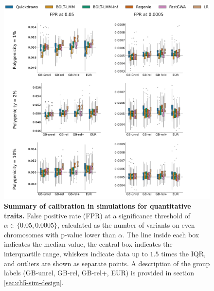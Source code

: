\begin{figure}[h!]
    \centering
    \includegraphics[width=\textwidth]{figures/sim_calibration/qt_fpr.pdf}
    
    \caption{\textbf{Summary of calibration in simulations for quantitative traits.}
    False positive rate (FPR) at a significance threshold of $\alpha \in \{0.05, 0.0005\}$, calculated as the number of variants on even chromosomes with p-value lower than $\alpha$.
    The line inside each box indicates the median value, the central box indicates the interquartile range, whiskers indicate data up to $1.5$ times the IQR, and outliers are shown as separate points.
    A description of the group labels (GB-unrel, GB-rel, GB-rel+, EUR) is provided in section \ref{sec:ch5-sim-design}.
    \label{fig:qd_sim_fpr_qt}
    }
\end{figure}

